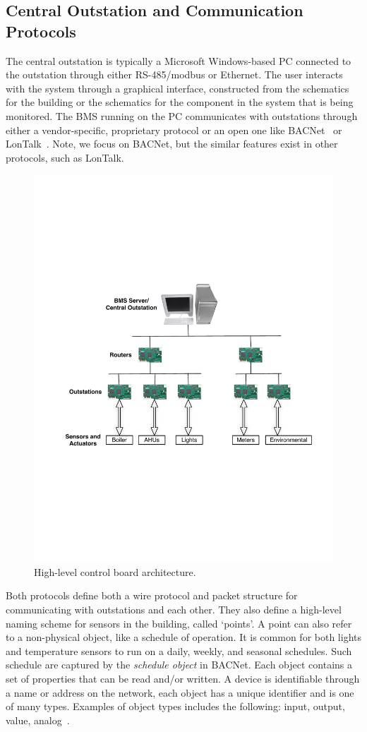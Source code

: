 \subsection{Central Outstation and Communication Protocols}
The central outstation is typically a Microsoft Windows-based PC connected to the outstation through either RS-485/modbus or Ethernet.
The user interacts with the system through a graphical interface, constructed from the schematics for the building or the schematics
for the component in the system that is being monitored.  The BMS running on the PC communicates with outstations through either a 
vendor-specific, proprietary protocol or an open one like BACNet~\cite{Bacnet} or LonTalk~\cite{LonTalk}.  Note, 
we focus on BACNet, but the similar features exist in other protocols, such as LonTalk.  

\begin{figure}[h!] %
\centering
\includegraphics[width=0.50\columnwidth]{figs/BMS_network}
\caption{High-level control board architecture.}
\label{fig:bms_network}
\end{figure}

Both protocols define both a wire protocol and packet structure for communicating with outstations and each other.  They also define a high-level
naming scheme for sensors in the building, called `points'.  A point can also refer to a non-physical object, like a schedule of operation.
It is common for both lights and temperature sensors to run on a daily, weekly, and seasonal schedules.  Such schedule are captured
by the \emph{schedule object} in BACNet.  
Each object contains a set of properties that can 
be read and/or written.  A device is identifiable through a name or address on the network, each object has a unique identifier and is one of
many types.  Examples of object types includes the following: input, output, value, analog~\cite{Bacnet}.  


